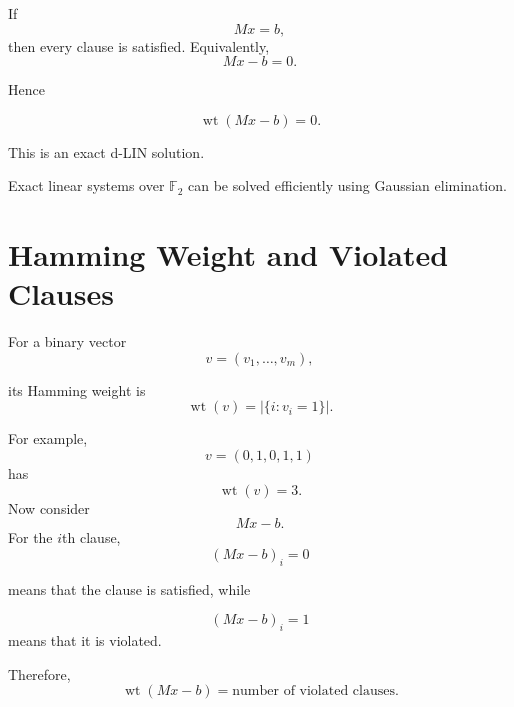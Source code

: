\documentclass[11pt,a4paper]{article}
\newcommand{\F}{\mathbb{F}}
\newcommand{\wt}{\operatorname{wt}}
\begin{document}
If \begin{equation}
    Mx=b,
\end{equation}
then every clause is satisfied.
Equivalently, \begin{equation}
    Mx-b=0.
\end{equation}

Hence

\begin{equation}
    \wt(Mx-b)=0.
\end{equation}

This is an exact d-LIN solution.

Exact linear systems over $\F_2$ can be solved efficiently
using Gaussian elimination. 

\section{Hamming Weight and Violated Clauses}

For a binary vector \begin{equation}
v=(v_1,\ldots,v_m),
\end{equation}

its Hamming weight is \begin{equation}
    \wt(v)=\left|\{i:v_i=1\}\right|.
\end{equation}

For example,\begin{equation}
v=(0,1,0,1,1)
\end{equation}
has\begin{equation}
    \wt(v)=3.
\end{equation}
Now consider\begin{equation}
    Mx-b.
\end{equation}
For the $i$th clause, \begin{equation}
    (Mx-b)_i=0
\end{equation}

means that the clause is satisfied, while

\begin{equation}
    (Mx-b)_i=1
\end{equation} means that it is violated.

Therefore, \textbf{\begin{equation}
    \boxed{
    \wt(Mx-b)
    =
    \text{number of violated clauses}.
    }
\end{equation}}

\end{document}
